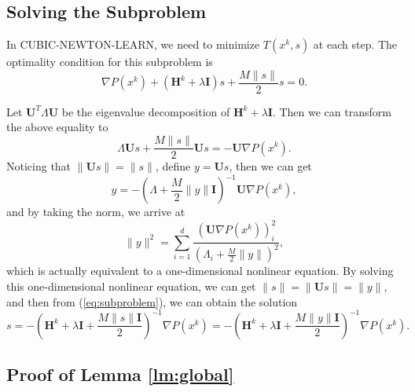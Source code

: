 \documentclass[12pt]{article}
\newcommand{\mH}{\mathbf{H}}
\newcommand{\mI}{\mathbf{I}}
\newcommand{\mU}{\mathbf{U}}
\begin{document}

\subsection{Solving the Subproblem}\label{sec:subproblem}

In {\sf CUBIC-NEWTON-LEARN}, we need to minimize $T(x^k, s)$ at each step. The optimality condition for this subproblem is 
\begin{equation}\label{eq:subproblem}
\nabla P(x^k) + (\mH^k + \lambda \mI)s + \frac{M\|s\|}{2}s = 0. 
\end{equation}

Let $\mU^T \Lambda \mU$ be the eigenvalue decomposition of $\mH^k + \lambda \mI$. Then we can transform the above equality to 
$$
\Lambda \mU s + \frac{M\|s\|}{2} \mU s = - \mU \nabla P(x^k). 
$$
Noticing that $\| \mU s\| = \|s\|$, define $y = \mU s$, then we can get 
$$
y = - \left(  \Lambda + \frac{M}{2}\|y\|\mI  \right)^{-1} \mU \nabla P(x^k), 
$$
and by taking the norm, we arrive at 
$$
\|y\|^2 = \sum_{i=1}^d \frac{\left(  \mU\nabla P(x^k)  \right)_i^2 }{(\Lambda_i + \frac{M}{2}\|y\|)^2}, 
$$
which is actually equivalent to a one-dimensional nonlinear equation. By solving this one-dimensional nonlinear equation, we can get $\|s\| = \|\mU s\| = \|y\|$, and then from (\ref{eq:subproblem}), we can obtain the solution 
$$
s = - \left(  \mH^k + \lambda \mI + \frac{M\|s\|\mI}{2}  \right)^{-1} \nabla P(x^k) = - \left(  \mH^k + \lambda \mI + \frac{M\|y\|\mI}{2}  \right)^{-1} \nabla P(x^k). 
$$





\subsection{Proof of Lemma \ref{lm:global}}
\end{document}
